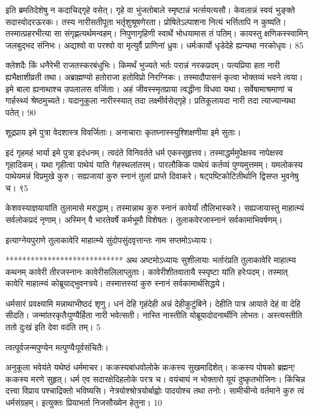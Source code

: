 इति ब्रमतिदेशेषु न कदाचिद्गृहे वसेत्।
गृहे वा भुंजतोबाले स्मृष्टान्नं भर्त्सयत्यसौ।
केवलान्नं स्वयं भुङ्क्ते सदास्वोदरऊरकः।
तस्य नारीसतीपूता भर्तृशुश्रूषणेरता।
प्रोषितेऽल्पाशना नित्यं भर्त्तितापि न कुष्यति।
तस्मात्प्रहरभीत्या सा संगृह्णत्यर्थमन्वहम्।
निपुणागृहिणी स्वार्थे भोधयामास तं पतिम्।
कायस्तु क्षणिकस्स्वामिन् जलबुद्भद संनिभः।
अद्यश्वो वा परश्वो वा मृत्युर्वै प्राणिनां ध्रुवः।
धर्मःकार्यो धृडेदेहे ह्यन्यथा नरकोधृवः।
85

क्लेशदैः किं धनैरेभी राजतस्करबंधुभिः।
किमर्थं भुज्यते भर्तः परान्नं नरकप्रदम्।
पत्यप्रिया हता नारी ह्यभैक्षाशीव्रती तथा।
अब्राह्मण्यो हतोराजा हतोविप्रो निरग्निकः।
तस्मादौपासनं कृत्वा भोक्तव्यं भवने त्वया।
इमे बाला ह्यनाथाश्च उपलालस वर्जिताः।
अहं जीवस्स्मृतप्राया त्वद्धीना विधवा यथा।
सर्वेषामाश्रमाणां च गार्हस्थ्यं श्रेष्ठमुच्यते।
यदानुकूला नारीस्स्यात् तदा लक्ष्मीर्वसेद्गृहे।
प्रतिकूलायदा नारी तदा त्याज्यान्यथा पतेत्।
90

शूद्रप्राय इमे पुत्रा वेदशास्त्र विवर्जिताः।
अनाचाराः कृतघ्नास्स्युश्शिक्षणीया इमे सुताः।

इदं गृहमहं भार्या इमे पुत्रा इदंधनम्।
त्वदंते विनिवर्तते धर्म एकस्सुहृत्तव।
तस्माद्धर्ममुपेक्षस्व नापेक्षस्व गृहादिकम्।
यथा गृहीत्वा पाथेयं याति गेहस्थलांतरम्।
पारलौकिक पाथेयं कर्तव्यं पुण्यमुत्तमम्।
यमलोकस्य पाथेयमन्नं विप्रमुखे कुरु।
सह्यजायां कुरु स्नानं तुलां प्राप्ते दिवाकरे।
षट्पष्टिकोटितीर्थानि द्विसप्त भुवनेषु च।
९5

केशवस्याज्ञयायांति तुलामासे मरुद्धाम्।
तस्मान्नाथ कुरु स्नानं कावेर्यां तौलिभास्करे।
सह्यजायास्तु माहात्म्यं सर्वलोकप्रदं नृणाम्।
अस्मिन् वै भारतेवर्षे कर्मभूमौ विशेषतः।
तुलाकवेरजास्नानं सर्वकामाभिवर्षणम्।

इत्याग्नेयपुराणे तुलाकावेरि माहात्म्ये सुंदोपसुंदवृत्तान्तः नाम सप्तमोऽध्यायः।

****************************
अथ अष्टमोऽध्यायः सुशीलायाः भर्तारंप्रति तुलाकावेरि माहात्म्य कथनम् कावेरी तीरजस्नानः कावेरीसलिलाप्लुताः।
कावेरीशीतवातायै स्स्पृष्टा यांति हरेःपदम्।
तस्मात् कावेरि माहात्म्यं कोब्रूयाद्भुवनत्रये।
तस्मात्तस्यां कुरु स्नानं सर्वकामार्थसिद्धये।

धर्मसारं प्रवक्ष्यामि मन्नाथाभीष्ठदं शृणु।
धनं देहि गृहंदेही अन्नं देहीकुटुंबिने।
देहीति पात्र आयाते देहं वा देहि सीदति।
जन्मांतरकृतैःपुण्यैर्हिता नारी भवेत्सती।
नास्ति नास्तीति योब्रूयादोदनार्थीनि लोभतः।
अस्त्यस्तीति ततो दुःखं इति देवा वदंति तम्।
5

त्वत्पूर्वजन्मपुण्येन मत्पुण्यैःपूर्वसंचितैः।

अनुकूला भवेयंते यथेष्ठं धर्ममाचर।
कःकस्यबांधवोलोके कःकस्य सुखमादिशेत्।
कःकस्य पोषको ब्रह्मन्! कःकस्य मरणे सुहृत्।
धर्म एव सदारक्षेदिहलोके परत्र च।
वयंचाघं न भोक्तारो यूयं दुष्कृतभोजिनः।
किंचिन्न दत्त्वा विप्राय पश्चाद्रिक्तो भविष्यसि।
नेत्रयोश्श्रोत्रयोर्बाह्वोः पादयोश्च तथा तनोः।
सामीचीन्ये वर्तमाने कुरु त्वं धर्मसंग्रहम्।
इत्युक्तः प्रियाभर्ता निजसौख्येन हेतुना।
10

